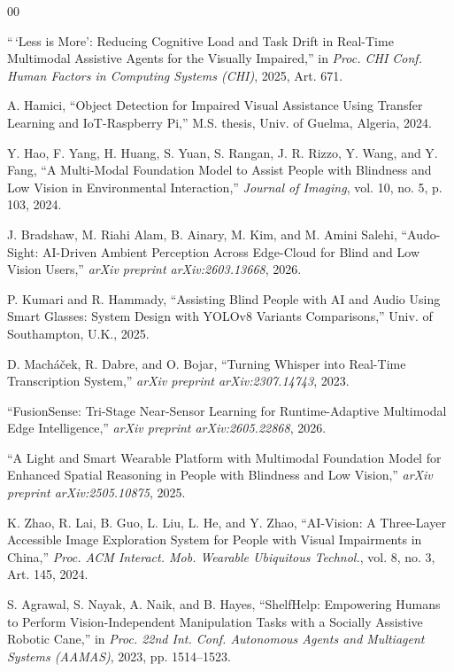 \documentclass[conference]{IEEEtran}
\begin{document}
\begin{thebibliography}{00}

 ``\,`Less is More': Reducing Cognitive Load and Task Drift in Real-Time Multimodal Assistive Agents for the Visually Impaired,'' in \textit{Proc. CHI Conf. Human Factors in Computing Systems (CHI)}, 2025, Art. 671.

 A. Hamici, ``Object Detection for Impaired Visual Assistance Using Transfer Learning and IoT-Raspberry Pi,'' M.S. thesis, Univ. of Guelma, Algeria, 2024.

 Y. Hao, F. Yang, H. Huang, S. Yuan, S. Rangan, J. R. Rizzo, Y. Wang, and Y. Fang, ``A Multi-Modal Foundation Model to Assist People with Blindness and Low Vision in Environmental Interaction,'' \textit{Journal of Imaging}, vol. 10, no. 5, p. 103, 2024.

 J. Bradshaw, M. Riahi Alam, B. Ainary, M. Kim, and M. Amini Salehi, ``Audo-Sight: AI-Driven Ambient Perception Across Edge-Cloud for Blind and Low Vision Users,'' \textit{arXiv preprint arXiv:2603.13668}, 2026.

 P. Kumari and R. Hammady, ``Assisting Blind People with AI and Audio Using Smart Glasses: System Design with YOLOv8 Variants Comparisons,'' Univ. of Southampton, U.K., 2025.

 D. Mach{\'a}{\v{c}}ek, R. Dabre, and O. Bojar, ``Turning Whisper into Real-Time Transcription System,'' \textit{arXiv preprint arXiv:2307.14743}, 2023.

 ``FusionSense: Tri-Stage Near-Sensor Learning for Runtime-Adaptive Multimodal Edge Intelligence,'' \textit{arXiv preprint arXiv:2605.22868}, 2026.

 ``A Light and Smart Wearable Platform with Multimodal Foundation Model for Enhanced Spatial Reasoning in People with Blindness and Low Vision,'' \textit{arXiv preprint arXiv:2505.10875}, 2025.

 K. Zhao, R. Lai, B. Guo, L. Liu, L. He, and Y. Zhao, ``AI-Vision: A Three-Layer Accessible Image Exploration System for People with Visual Impairments in China,'' \textit{Proc. ACM Interact. Mob. Wearable Ubiquitous Technol.}, vol. 8, no. 3, Art. 145, 2024.

 S. Agrawal, S. Nayak, A. Naik, and B. Hayes, ``ShelfHelp: Empowering Humans to Perform Vision-Independent Manipulation Tasks with a Socially Assistive Robotic Cane,'' in \textit{Proc. 22nd Int. Conf. Autonomous Agents and Multiagent Systems (AAMAS)}, 2023, pp. 1514--1523.


\end{thebibliography}
\end{document}
